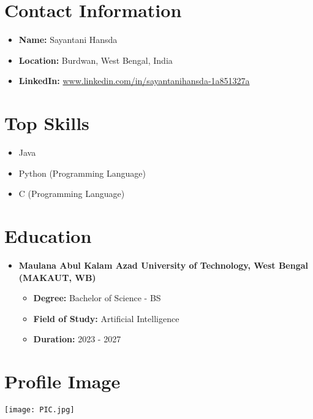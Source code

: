 \documentclass{article}
\begin{document}
\section*{Contact Information}
\begin{itemize}
    \item \textbf{Name:} Sayantani Hansda
    \item \textbf{Location:} Burdwan, West Bengal, India
    \item \textbf{LinkedIn:} \href{https://www.linkedin.com/in/sayantanihansda-1a851327a}{www.linkedin.com/in/sayantanihansda-1a851327a}
\end{itemize}

\section*{Top Skills}
\begin{itemize}
    \item Java
    \item Python (Programming Language)
    \item C (Programming Language)
\end{itemize}

\section*{Education}
\begin{itemize}
    \item \textbf{Maulana Abul Kalam Azad University of Technology, West Bengal (MAKAUT, WB)}
    \begin{itemize}
        \item \textbf{Degree:} Bachelor of Science - BS
        \item \textbf{Field of Study:} Artificial Intelligence
        \item \textbf{Duration:} 2023 - 2027
    \end{itemize}
\end{itemize}

\section*{Profile Image}
\begin{center}
    \texttt{[image: PIC.jpg]}
\end{center}
\end{document}
